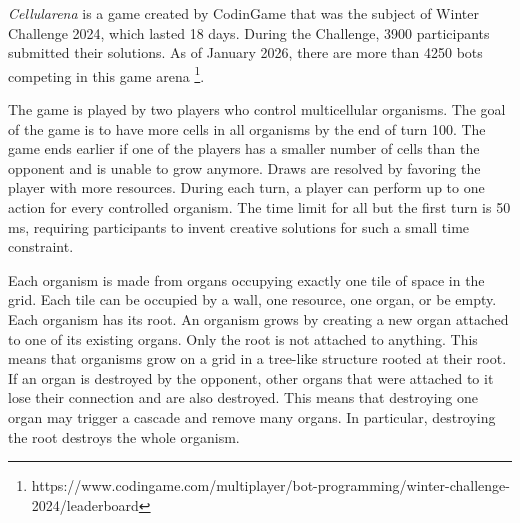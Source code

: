 \documentclass[shortabstract, mgr, english]{iithesis}
\begin{document}
\emph{Cellularena} is a game created by CodinGame that was the subject of Winter Challenge 2024, which lasted 18 days. During the Challenge, 3900 participants submitted their solutions. As of January 2026, there are more than 4250 bots competing in this game arena \footnote{https://www.codingame.com/multiplayer/bot-programming/winter-challenge-2024/leaderboard}.

The game is played by two players who control multicellular organisms. The goal of the game is to have more cells in all organisms by the end of turn 100. The game ends earlier if one of the players has a smaller number of cells than the opponent and is unable to grow anymore. Draws are resolved by favoring the player with more resources. During each turn, a player can perform up to one action for every controlled organism. The time limit for all but the first turn is 50 ms, requiring participants to invent creative solutions for such a small time constraint.

Each organism is made from organs occupying exactly one tile of space in the grid. Each tile can be occupied by a wall, one resource, one organ, or be empty. Each organism has its root. An organism grows by creating a new organ attached to one of its existing organs. Only the root is not attached to anything. This means that organisms grow on a grid in a tree-like structure rooted at their root. If an organ is destroyed by the opponent, other organs that were attached to it lose their connection and are also destroyed. This means that destroying one organ may trigger a cascade and remove many organs. In particular, destroying the root destroys the whole organism. 
\end{document}
